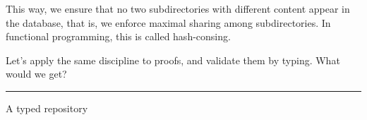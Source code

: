 \documentclass[ignorenonframetext,red]{beamer}
\begin{document}
This way, we ensure that no two subdirectories with different content
appear in the database, that is, we enforce maximal sharing among
subdirectories. In functional programming, this is called
hash-consing.

Let's apply the same discipline to proofs, and validate them by
typing. What would we get?

\hrule
\begin{frame}{A typed repository}

\end{frame}
\end{document}
